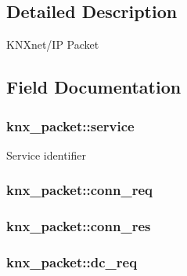 \subsection{Detailed Description}
K\+N\+Xnet/\+IP Packet 

\subsection{Field Documentation}
\subsubsection[{\texorpdfstring{service}{service}}]{ knx\+\_\+packet\+::service}\hypertarget{structknx__packet_a261e009afb82702c74622ee1f1b71379}{}\label{structknx__packet_a261e009afb82702c74622ee1f1b71379}
Service identifier 
\subsubsection[{\texorpdfstring{conn\+\_\+req}{conn_req}}]{ knx\+\_\+packet\+::conn\+\_\+req}\hypertarget{structknx__packet_a4b13c7c00d121f4d8b9d9dd642b7030b}{}\label{structknx__packet_a4b13c7c00d121f4d8b9d9dd642b7030b}
\subsubsection[{\texorpdfstring{conn\+\_\+res}{conn_res}}]{ knx\+\_\+packet\+::conn\+\_\+res}\hypertarget{structknx__packet_a249c9a779cb81c818cf8982e29903866}{}\label{structknx__packet_a249c9a779cb81c818cf8982e29903866}
\subsubsection[{\texorpdfstring{dc\+\_\+req}{dc_req}}]{ knx\+\_\+packet\+::dc\+\_\+req}\hypertarget{structknx__packet_ac73f1384f312aed4ece535b1af138e51}{}\label{structknx__packet_ac73f1384f312aed4ece535b1af138e51}
